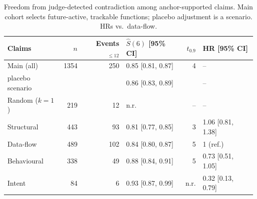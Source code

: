 \begin{table}[t]
\centering
\caption{Freedom from judge-detected contradiction among anchor-supported claims. Main cohort selects future-active, trackable functions; placebo adjustment is a scenario. HRs vs.\ data-flow.}
\label{tab:survival}
\footnotesize
\setlength{\tabcolsep}{1.3pt}
\begin{tabular}{@{}lrrlrl@{}}
\toprule
Claims & $n$ & Events$_{\le 12}$ & $\hat S(6)$ [95\% CI] & $t_{0.9}$ & HR [95\% CI] \\
\midrule
Main (all) & 1354 & 250 & 0.85 [0.81, 0.87] & 4 & -- \\
\quad placebo scenario & & & 0.86 [0.83, 0.89] & & -- \\
Random ($k{=}1$) & 219 & 12 & n.r. & -- & -- \\
\midrule
Structural & 443 & 93 & 0.81 [0.77, 0.85] & 3 & 1.06 [0.81, 1.38] \\
Data-flow & 489 & 102 & 0.84 [0.80, 0.87] & 5 & 1 (ref.) \\
Behavioural & 338 & 49 & 0.88 [0.84, 0.91] & 5 & 0.73 [0.51, 1.05] \\
Intent & 84 & 6 & 0.93 [0.87, 0.99] & n.r. & 0.32 [0.13, 0.79] \\
\bottomrule
\end{tabular}
\end{table}
